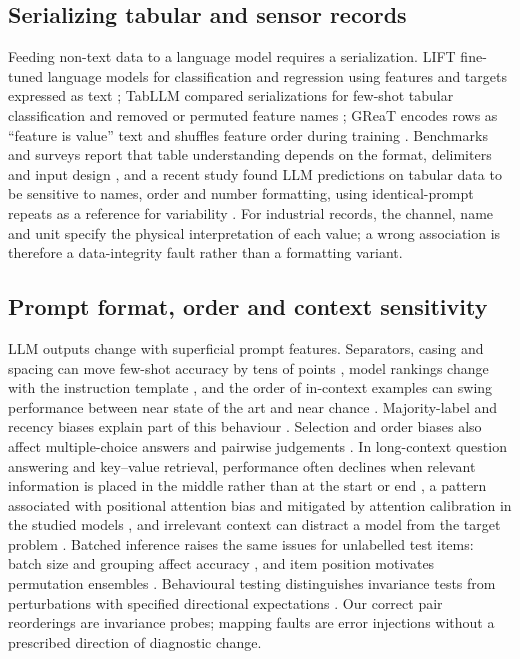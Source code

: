 \documentclass[11pt,a4paper]{article}
\begin{document}
\subsection{Serializing tabular and sensor records}
Feeding non-text data to a language model requires a serialization. LIFT fine-tuned language models for classification and regression using features and targets expressed as text \citep{dinh2022lift}; TabLLM compared serializations for few-shot tabular classification and removed or permuted feature names \citep{hegselmann2023tabllm}; GReaT encodes rows as ``feature is value'' text and shuffles feature order during training \citep{borisov2023great}. Benchmarks and surveys report that table understanding depends on the format, delimiters and input design \citep{sui2024table,fang2024tabular}, and a recent study found LLM predictions on tabular data to be sensitive to names, order and number formatting, using identical-prompt repeats as a reference for variability \citep{liu2026tabularrobustness}. For industrial records, the channel, name and unit specify the physical interpretation of each value; a wrong association is therefore a data-integrity fault rather than a formatting variant.

\subsection{Prompt format, order and context sensitivity}
LLM outputs change with superficial prompt features. Separators, casing and spacing can move few-shot accuracy by tens of points \citep{sclar2024quantifying}, model rankings change with the instruction template \citep{mizrahi2024state}, and the order of in-context examples can swing performance between near state of the art and near chance \citep{lu2022fantastically}. Majority-label and recency biases explain part of this behaviour \citep{zhao2021calibrate}. Selection and order biases also affect multiple-choice answers \citep{zheng2024notrobust,pezeshkpour2024order} and pairwise judgements \citep{wang2024fair}. In long-context question answering and key--value retrieval, performance often declines when relevant information is placed in the middle rather than at the start or end \citep{liu2024lost}, a pattern associated with positional attention bias and mitigated by attention calibration in the studied models \citep{hsieh2024found}, and irrelevant context can distract a model from the target problem \citep{shi2023distracted}. Batched inference raises the same issues for unlabelled test items: batch size and grouping affect accuracy \citep{cheng2023batch,fan2024batcher}, and item position motivates permutation ensembles \citep{lin2024batchprompt}. Behavioural testing distinguishes invariance tests from perturbations with specified directional expectations \citep{ribeiro2020beyond}. Our correct pair reorderings are invariance probes; mapping faults are error injections without a prescribed direction of diagnostic change.
\end{document}
